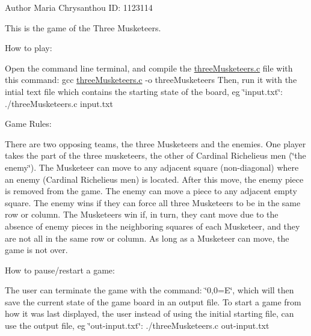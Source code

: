 \begin{DoxyAuthor}{Author}
Maria Chrysanthou ID\+: 1123114
\end{DoxyAuthor}
This is the game of the Three Musketeers.

How to play\+:

Open the command line terminal, and compile the \mbox{\hyperlink{threeMusketeers_8c}{three\+Musketeers.\+c}} file with this command\+: gcc \mbox{\hyperlink{threeMusketeers_8c}{three\+Musketeers.\+c}} -\/o three\+Musketeers Then, run it with the intial text file which contains the starting state of the board, eg \char`\"{}input.\+txt\char`\"{}\+: ./three\+Musketeers.c input.\+txt

Game Rules\+:

There are two opposing teams, the three Musketeers and the enemies. One player takes the part of the three musketeers, the other of Cardinal Richelieu\textquotesingle{}s men (\char`\"{}the enemy\char`\"{}). The Musketeer can move to any adjacent square (non-\/diagonal) where an enemy (Cardinal Richelieu\textquotesingle{}s men) is located. After this move, the enemy piece is removed from the game. The enemy can move a piece to any adjacent empty square. The enemy wins if they can force all three Musketeers to be in the same row or column. The Musketeers win if, in turn, they can\textquotesingle{}t move due to the absence of enemy pieces in the neighboring squares of each Musketeer, and they are not all in the same row or column. As long as a Musketeer can move, the game is not over.

How to pause/restart a game\+:

The user can terminate the game with the command\+: \char`\"{}0,0=\+E\char`\"{}, which will then save the current state of the game board in an output file. To start a game from how it was last displayed, the user instead of using the initial starting file, can use the output file, eg \char`\"{}out-\/input.\+txt\char`\"{}\+: ./three\+Musketeers.c out-\/input.\+txt 